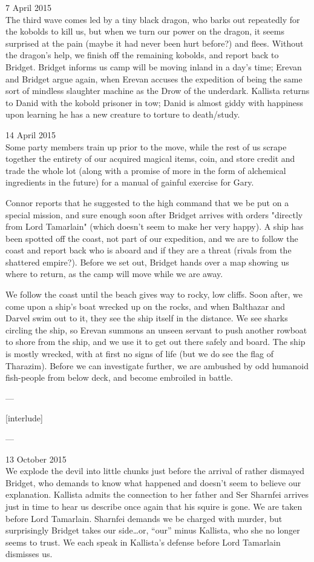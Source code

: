 \documentclass[letterpaper]{article}
\begin{document}
7 April 2015 \\
The third wave comes led by a tiny black dragon, who barks out repeatedly for the kobolds to kill us, but when we turn our power on the dragon, it seems surprised at the pain (maybe it had never been hurt before?) and flees. Without the dragon's help, we finish off the remaining kobolds, and report back to Bridget. Bridget informs us camp will be moving inland in a day's time; Erevan and Bridget argue again, when Erevan accuses the expedition of being the same sort of mindless slaughter machine as the Drow of the underdark. Kallista returns to Danid with the kobold prisoner in tow; Danid is almost giddy with happiness upon learning he has a new creature to torture to death/study.

14 April 2015 \\
Some party members train up prior to the move, while the rest of us scrape together the entirety of our acquired magical items, coin, and store credit and trade the whole lot (along with a promise of more in the form of alchemical ingredients in the future) for a manual of gainful exercise for Gary. 

Connor reports that he suggested to the high command that we be put on a special mission, and sure enough soon after Bridget arrives with orders "directly from Lord Tamarlain" (which doesn't seem to make her very happy). A ship has been spotted off the coast, not part of our expedition, and we are to follow the coast and report back who is aboard and if they are a threat (rivals from the shattered empire?). Before we set out, Bridget hands over a map showing us where to return, as the camp will move while we are away.

We follow the coast until the beach gives way to rocky, low cliffs. Soon after, we come upon a ship's boat wrecked up on the rocks, and when Balthazar and Darvel swim out to it, they see the ship itself in the distance. We see sharks circling the ship, so Erevan summons an unseen servant to push another rowboat to shore from the ship, and we use it to get out there safely and board. The ship is mostly wrecked, with at first no signs of life (but we do see the flag of Tharazim). Before we can investigate further, we are ambushed by odd humanoid fish-people from below deck, and become embroiled in battle.

---

[interlude]

---

13 October 2015 \\
We explode the devil into little chunks just before the arrival of rather dismayed Bridget, who demands to know what happened and doesn't seem to believe our explanation. Kallista admits the connection to her father and Ser Sharnfei arrives just in time to hear us describe once again that his squire is gone. We are taken before Lord Tamarlain. Sharnfei demands we be charged with murder, but surprisingly Bridget takes our side\ldots or, ``our'' minus Kallista, who she no longer seems to trust. We each speak in Kallista's defense before Lord Tamarlain dismisses us.
\end{document}
